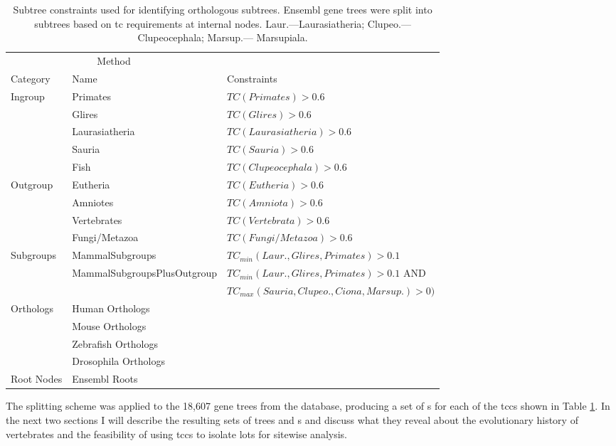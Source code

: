 \begin{table} \footnotesize
\centering
\begin{tabular}{@{}lll@{}} \toprule
\multicolumn{2}{c}{Method} \\ \cmidrule(r){1-2}
   Category & Name & Constraints \\ \midrule
Ingroup & Primates & $TC(Primates) > 0.6$ \\
 &   Glires &  $TC(Glires) > 0.6$ \\
 &   Laurasiatheria & $TC(Laurasiatheria) > 0.6$ \\
 &   Sauria & $TC(Sauria) > 0.6$ \\
 &   Fish & $TC(Clupeocephala) > 0.6$ \\
Outgroup &  Eutheria & $TC(Eutheria) > 0.6$ \\
 &   Amniotes & $TC(Amniota) > 0.6$\\
 &   Vertebrates & $TC(Vertebrata) > 0.6$\\
 &   Fungi/Metazoa & $TC(Fungi/Metazoa) > 0.6$\\
Subgroups &  MammalSubgroups & $TC_{min}(Laur., Glires, Primates) > 0.1$\\
 &   \scriptsize{MammalSubgroupsPlusOutgroup} & $TC_{min}(Laur., Glires, Primates) > 0.1$ AND \\
 &    & $TC_{max}(Sauria, Clupeo., Ciona, Marsup.) > 0)$ \\
Orthologs & Human Orthologs & \\
 &   Mouse Orthologs &  \\
 &   Zebrafish Orthologs &  \\
 &   Drosophila Orthologs &  \\
Root Nodes & Ensembl Roots &  \\
\bottomrule
\end{tabular}
\caption{Subtree constraints used for identifying \euth
  orthologous subtrees. Ensembl gene trees were split into subtrees
  based on \acf{tc} requirements at internal
  nodes. Laur.---Laurasiatheria; Clupeo.---Clupeocephala; Marsup.---
  Marsupiala.}
\label{table_subtree_constraints}
\end{table}

The \subtr{} splitting scheme was applied to the 18,607 gene trees
from the \cmp database, producing a set of \subtr{}s for each of the
\acp{tcc} shown in Table \ref{table_subtree_constraints}. In the next two
sections I will describe the resulting sets of trees and \subtr{}s and
discuss what they reveal about the evolutionary history of vertebrates
and the feasibility of using \acp{tcc} to isolate \mammln \acp{lot} for
sitewise analysis.

